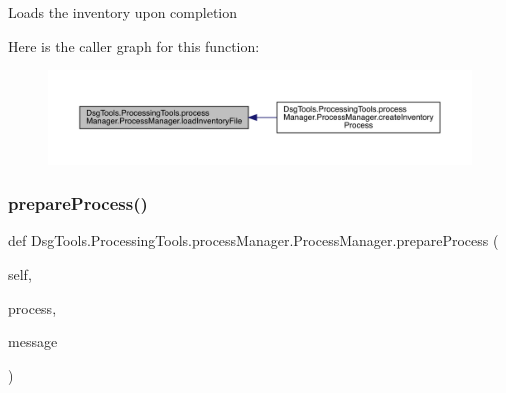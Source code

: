 \begin{DoxyVerb}Loads the inventory upon completion
\end{DoxyVerb}
 Here is the caller graph for this function\+:
\nopagebreak
\begin{figure}[H]
\begin{center}
\leavevmode
\includegraphics[width=350pt]{class_dsg_tools_1_1_processing_tools_1_1process_manager_1_1_process_manager_a0c50cae9890b30ee3d01b34622ca0dbb_icgraph}
\end{center}
\end{figure}
\mbox{\label{class_dsg_tools_1_1_processing_tools_1_1process_manager_1_1_process_manager_a314d0e639c22ed78d70c63a6740a5337}} 
\subsubsection{\texorpdfstring{prepare\+Process()}{prepareProcess()}}
{\footnotesize\ttfamily def Dsg\+Tools.\+Processing\+Tools.\+process\+Manager.\+Process\+Manager.\+prepare\+Process (\begin{DoxyParamCaption}\item[{}]{self,  }\item[{}]{process,  }\item[{}]{message }\end{DoxyParamCaption})}

